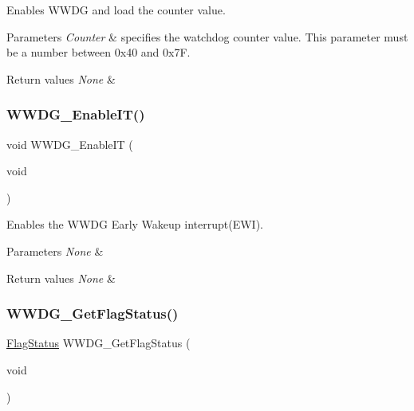 Enables W\+W\+DG and load the counter value. 


\begin{DoxyParams}{Parameters}
{\em Counter} & specifies the watchdog counter value. This parameter must be a number between 0x40 and 0x7F. \\
\hline
\end{DoxyParams}

\begin{DoxyRetVals}{Return values}
{\em None} & \\
\hline
\end{DoxyRetVals}
\mbox{\label{group___w_w_d_g___private___functions_gac8af66ea5254d3d78b60b9b7c7f29521}} 
\subsubsection{\texorpdfstring{WWDG\_EnableIT()}{WWDG\_EnableIT()}}
{\footnotesize\ttfamily void W\+W\+D\+G\+\_\+\+Enable\+IT (\begin{DoxyParamCaption}\item[{void}]{ }\end{DoxyParamCaption})}



Enables the W\+W\+DG Early Wakeup interrupt(\+E\+W\+I). 


\begin{DoxyParams}{Parameters}
{\em None} & \\
\hline
\end{DoxyParams}

\begin{DoxyRetVals}{Return values}
{\em None} & \\
\hline
\end{DoxyRetVals}
\mbox{\label{group___w_w_d_g___private___functions_ga7df4882d45918b9b8249dfca1e44fabc}} 
\subsubsection{\texorpdfstring{WWDG\_GetFlagStatus()}{WWDG\_GetFlagStatus()}}
{\footnotesize\ttfamily \mbox{\hyperlink{group___exported__types_ga89136caac2e14c55151f527ac02daaff}{Flag\+Status}} W\+W\+D\+G\+\_\+\+Get\+Flag\+Status (\begin{DoxyParamCaption}\item[{void}]{ }\end{DoxyParamCaption})}



